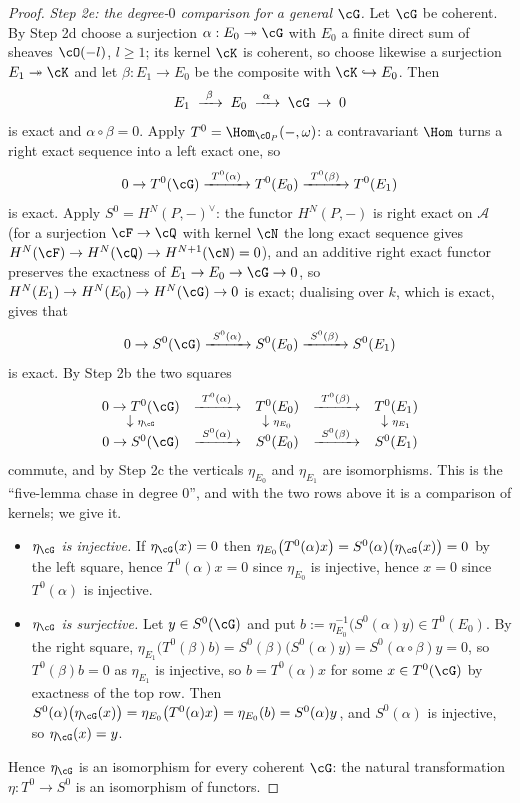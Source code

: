 \begin{proof}
\emph{Step 2e: the degree-$0$ comparison for a general $\cG$.}  Let
$\cG$ be coherent.  By Step 2d choose a surjection
$\alpha:E_0\twoheadrightarrow\cG$ with $E_0$ a finite direct sum of
sheaves $\cO(-l)$, $l\ge1$; its kernel $\cK$ is coherent, so choose
likewise a surjection $E_1\twoheadrightarrow\cK$ and let
$\beta:E_1\to E_0$ be the composite with $\cK\hookrightarrow E_0$.
Then
\[
E_1\;\xrightarrow{\ \beta\ }\;E_0\;\xrightarrow{\ \alpha\ }\;\cG
\;\to\;0
\]
is exact and $\alpha\circ\beta=0$.  Apply $T^0=\Hom_{\cO_P}(-,\omega)$:
a contravariant $\Hom$ turns a right exact sequence into a left exact
one, so
\[
0\to T^0(\cG)\xrightarrow{\ T^0(\alpha)\ }T^0(E_0)
\xrightarrow{\ T^0(\beta)\ }T^0(E_1)
\]
is exact.  Apply $S^0=H^N(P,-)^{\vee}$: the functor $H^N(P,-)$ is
right exact on $\mathcal A$ (for a surjection $\cF\to\cQ$ with kernel
$\cN$ the long exact sequence gives
$H^N(\cF)\to H^N(\cQ)\to H^{N+1}(\cN)=0$), and an additive right
exact functor preserves the exactness of
$E_1\to E_0\to\cG\to0$, so $H^N(E_1)\to H^N(E_0)\to H^N(\cG)\to0$ is
exact; dualising over $k$, which is exact, gives that
\[
0\to S^0(\cG)\xrightarrow{\ S^0(\alpha)\ }S^0(E_0)
\xrightarrow{\ S^0(\beta)\ }S^0(E_1)
\]
is exact.  By Step 2b the two squares
\[
\begin{array}{ccccc}
0\to T^0(\cG) & \xrightarrow{\ T^0(\alpha)\ } & T^0(E_0)
 & \xrightarrow{\ T^0(\beta)\ } & T^0(E_1)\\[-2pt]
\downarrow{\scriptstyle \eta_{\cG}} & & \downarrow{\scriptstyle \eta_{E_0}}
 & & \downarrow{\scriptstyle \eta_{E_1}}\\[-2pt]
0\to S^0(\cG) & \xrightarrow{\ S^0(\alpha)\ } & S^0(E_0)
 & \xrightarrow{\ S^0(\beta)\ } & S^0(E_1)
\end{array}
\]
commute, and by Step 2c the verticals $\eta_{E_0}$ and $\eta_{E_1}$
are isomorphisms.  This is the ``five-lemma chase in degree $0$'', and
with the two rows above it is a comparison of kernels; we give it.
\begin{itemize}
\item \emph{$\eta_{\cG}$ is injective.}  If $\eta_{\cG}(x)=0$ then
$\eta_{E_0}\bigl(T^0(\alpha)x\bigr)=S^0(\alpha)\bigl(\eta_{\cG}(x)\bigr)=0$
by the left square, hence $T^0(\alpha)x=0$ since $\eta_{E_0}$ is
injective, hence $x=0$ since $T^0(\alpha)$ is injective.
\item \emph{$\eta_{\cG}$ is surjective.}  Let $y\in S^0(\cG)$ and put
$b:=\eta_{E_0}^{-1}\bigl(S^0(\alpha)y\bigr)\in T^0(E_0)$.  By the
right square,
$\eta_{E_1}\bigl(T^0(\beta)b\bigr)=S^0(\beta)\bigl(S^0(\alpha)y\bigr)
=S^0(\alpha\circ\beta)y=0$, so $T^0(\beta)b=0$ as $\eta_{E_1}$ is
injective, so $b=T^0(\alpha)x$ for some $x\in T^0(\cG)$ by exactness
of the top row.  Then
$S^0(\alpha)\bigl(\eta_{\cG}(x)\bigr)=\eta_{E_0}\bigl(T^0(\alpha)x\bigr)
=\eta_{E_0}(b)=S^0(\alpha)y$, and $S^0(\alpha)$ is injective, so
$\eta_{\cG}(x)=y$.
\end{itemize}
Hence $\eta_{\cG}$ is an isomorphism for every coherent $\cG$: the
natural transformation $\eta:T^0\to S^0$ is an isomorphism of
functors.


\end{proof}
